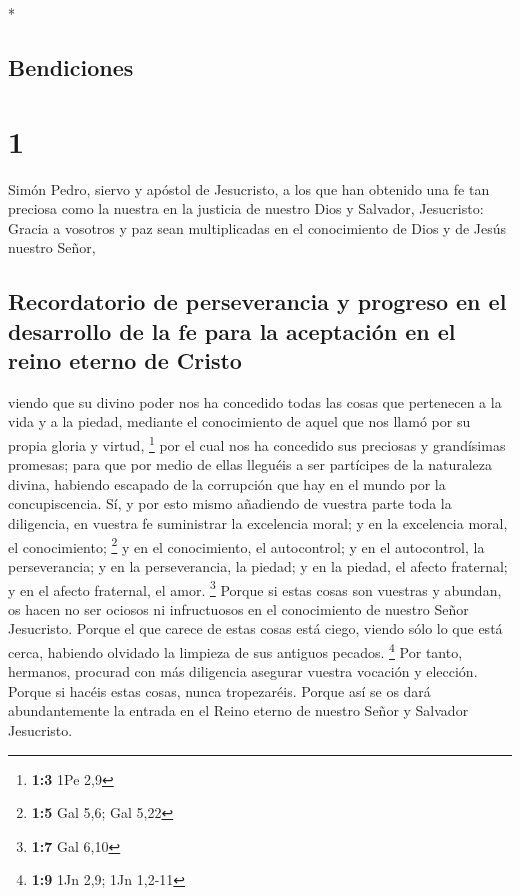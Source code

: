 \begin{paracol}{2} \switchcolumn[0]*

\hypertarget{bendiciones}{%
\subsection{Bendiciones}\label{bendiciones}}

\hypertarget{section}{%
\section{1}\label{section}}

 Simón Pedro, siervo y apóstol de Jesucristo, a los que
han obtenido una fe tan preciosa como la nuestra en la justicia de
nuestro Dios y Salvador, Jesucristo:  Gracia a vosotros y
paz sean multiplicadas en el conocimiento de Dios y de Jesús nuestro
Señor,

\hypertarget{recordatorio-de-perseverancia-y-progreso-en-el-desarrollo-de-la-fe-para-la-aceptaciuxf3n-en-el-reino-eterno-de-cristo}{%
\subsection{Recordatorio de perseverancia y progreso en el desarrollo de
la fe para la aceptación en el reino eterno de
Cristo}\label{recordatorio-de-perseverancia-y-progreso-en-el-desarrollo-de-la-fe-para-la-aceptaciuxf3n-en-el-reino-eterno-de-cristo}}

 viendo que su divino poder nos ha concedido todas las
cosas que pertenecen a la vida y a la piedad, mediante el conocimiento
de aquel que nos llamó por su propia gloria y virtud, \footnote{\textbf{1:3}
  1Pe 2,9}  por el cual nos ha concedido sus preciosas y
grandísimas promesas; para que por medio de ellas lleguéis a ser
partícipes de la naturaleza divina, habiendo escapado de la corrupción
que hay en el mundo por la concupiscencia.  Sí, y por esto
mismo añadiendo de vuestra parte toda la diligencia, en vuestra fe
suministrar la excelencia moral; y en la excelencia moral, el
conocimiento; \footnote{\textbf{1:5} Gal 5,6; Gal 5,22}  y
en el conocimiento, el autocontrol; y en el autocontrol, la
perseverancia; y en la perseverancia, la piedad;  y en la
piedad, el afecto fraternal; y en el afecto fraternal, el amor.
\footnote{\textbf{1:7} Gal 6,10}  Porque si estas cosas
son vuestras y abundan, os hacen no ser ociosos ni infructuosos en el
conocimiento de nuestro Señor Jesucristo.  Porque el que
carece de estas cosas está ciego, viendo sólo lo que está cerca,
habiendo olvidado la limpieza de sus antiguos pecados. \footnote{\textbf{1:9}
  1Jn 2,9; 1Jn 1,2-11}  Por tanto, hermanos, procurad con
más diligencia asegurar vuestra vocación y elección. Porque si hacéis
estas cosas, nunca tropezaréis.  Porque así se os dará
abundantemente la entrada en el Reino eterno de nuestro Señor y Salvador
Jesucristo.


\end{paracol}
